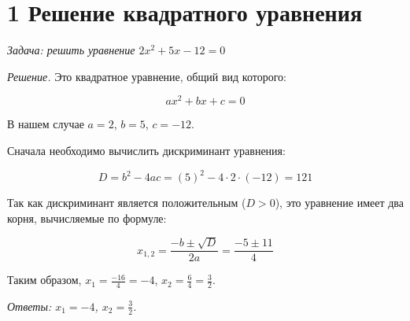 \documentclass{article}
\begin{document}
\section*{1  Решение квадратного уравнения}

\textit{Задача: решить уравнение \(2x^2 + 5x - 12 = 0\)}

\textit{Решение.} Это квадратное уравнение, общий вид которого:

\[
ax^2 + bx + c = 0
\]

В нашем случае \(a = 2\), \(b = 5\), \(c = -12\).

Сначала необходимо вычислить дискриминант уравнения:

\[
D = b^2 - 4ac = (5)^2 - 4 \cdot 2 \cdot (-12) = 121
\]

Так как дискриминант является положительным (\(D > 0\)), это уравнение имеет два корня, вычисляемые по формуле:

\[
x_{1,2} = \frac{-b \pm \sqrt{D}}{2a} = \frac{-5 \pm 11}{4}
\]

Таким образом, \(x_1 = \frac{-16}{4} = -4\), \(x_2 = \frac{6}{4} = \frac{3}{2}\).

\textit{Ответы: \(x_1 = -4\), \(x_2 = \frac{3}{2}\).}
\end{document}
